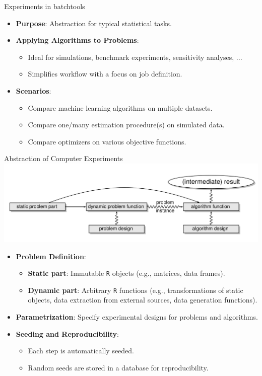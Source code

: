 \documentclass[10pt,compress,t,notes=noshow, xcolor=table]{beamer}
\begin{document}
\begin{frame}[fragile]{Experiments in batchtools}
  \begin{itemize}
  \item \textbf{Purpose}: Abstraction for typical statistical tasks.
  
  \item \textbf{Applying Algorithms to Problems}:
  \begin{itemize}
    \item Ideal for simulations, benchmark experiments, sensitivity analyses, ...
    \item Simplifies workflow with a focus on job definition.
  \end{itemize}

  \item \textbf{Scenarios}:
  \begin{itemize}
    \item Compare machine learning algorithms on multiple datasets.
    \item Compare one/many estimation procedure(s) on simulated data.
    \item Compare optimizers on various objective functions.
  \end{itemize}
    \end{itemize}
\end{frame}

\begin{frame}[fragile]{Abstraction of Computer Experiments}
  \centering
  \includegraphics{figure/experiments.png}
  \begin{itemize}
    \item \textbf{Problem Definition}:
      \begin{itemize}
        \item \textbf{Static part}: Immutable \texttt{R} objects (e.g., matrices, data frames).
        \item \textbf{Dynamic part}: Arbitrary \texttt{R} functions (e.g., transformations of static objects, data extraction from external sources, data generation functions).
      \end{itemize}
    \item \textbf{Parametrization}: Specify experimental designs for problems and algorithms.
    \item \textbf{Seeding and Reproducibility}:
      \begin{itemize}
        \item Each step is automatically seeded.
        \item Random seeds are stored in a database for reproducibility.
      \end{itemize}
  \end{itemize}
\end{frame}
\end{document}
